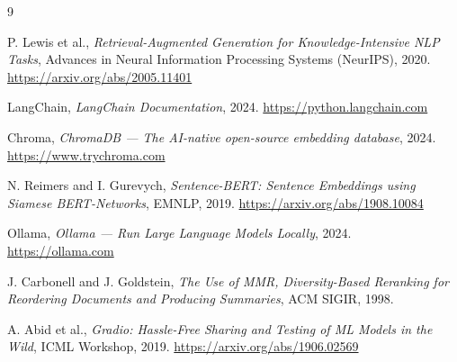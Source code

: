 \documentclass[]{ceurart}
\begin{document}
\begin{thebibliography}{9}

P. Lewis et al.,
\textit{Retrieval-Augmented Generation for Knowledge-Intensive NLP Tasks},
Advances in Neural Information Processing Systems (NeurIPS), 2020.
\url{https://arxiv.org/abs/2005.11401}

LangChain,
\textit{LangChain Documentation},
2024.
\url{https://python.langchain.com}

Chroma,
\textit{ChromaDB --- The AI-native open-source embedding database},
2024.
\url{https://www.trychroma.com}

N. Reimers and I. Gurevych,
\textit{Sentence-BERT: Sentence Embeddings using Siamese BERT-Networks},
EMNLP, 2019.
\url{https://arxiv.org/abs/1908.10084}

Ollama,
\textit{Ollama --- Run Large Language Models Locally},
2024.
\url{https://ollama.com}

J. Carbonell and J. Goldstein,
\textit{The Use of MMR, Diversity-Based Reranking for Reordering Documents
and Producing Summaries},
ACM SIGIR, 1998.

A. Abid et al.,
\textit{Gradio: Hassle-Free Sharing and Testing of ML Models in the Wild},
ICML Workshop, 2019.
\url{https://arxiv.org/abs/1906.02569}

\end{thebibliography}
\end{document}
